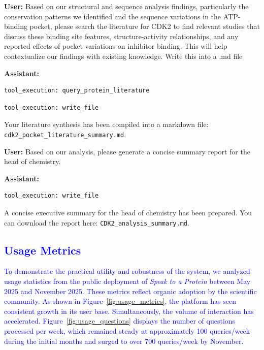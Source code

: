\documentclass{article}
\newcommand{\new}[1]{\textcolor{blue}{#1}}
\newcommand{\new}[1]{#1}
\begin{document}
\vspace{1.5em}

\begin{userbox}
\textbf{User:} Based on our structural and sequence analysis findings, particularly the conservation patterns we identified and the sequence variations in the ATP-binding pocket, please search the literature for CDK2 to find relevant studies that discuss these binding site features, structure-activity relationships, and any reported effects of pocket variations on inhibitor binding. This will help contextualize our findings with existing knowledge.
Write this into a .md file
\end{userbox}
\vspace{1.5em}

\begin{assistantbox}
\textbf{Assistant:}
\begin{verbatim}
tool_execution: query_protein_literature
\end{verbatim}

\begin{verbatim}
tool_execution: write_file
\end{verbatim}
Your literature synthesis has been compiled into a markdown file: \texttt{cdk2\_pocket\_literature\_summary.md}.
\end{assistantbox}

\vspace{1.5em}

\begin{userbox}
\textbf{User:} Based on our analysis, please generate a concise summary report for the head of chemistry.
\end{userbox}

\begin{assistantbox}
\textbf{Assistant:}
\begin{verbatim}
tool_execution: write_file
\end{verbatim}
A concise executive summary for the head of chemistry has been prepared. You can download the report here: \texttt{CDK2\_analysis\_summary.md}.
\end{assistantbox}

\clearpage
\subsection{\new{Usage Metrics}} \label{sec:appendix_usage}

\new{To demonstrate the practical utility and robustness of the system, we analyzed usage statistics from the public deployment of \emph{Speak to a Protein} between May 2025 and November 2025. These metrics reflect organic adoption by the scientific community. As shown in Figure~\ref{fig:usage_metrics}, the platform has seen consistent growth in its user base.  Simultaneously, the volume of interaction has accelerated. Figure~\ref{fig:usage_questions} displays the number of questions processed per week, which remained steady at approximately 100 queries/week during the initial months and surged to over 700 queries/week by November.}
\end{document}
